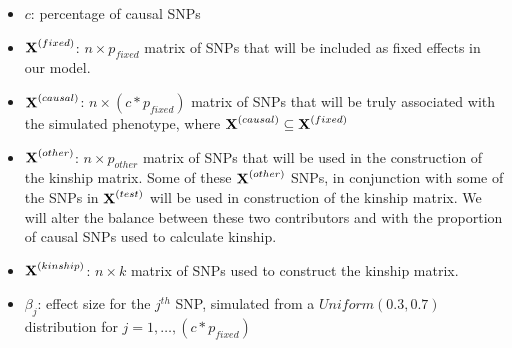\begin{itemize}
	\item $c$: percentage of causal SNPs
	\item $\textbf{X}^{(fixed)}$: $n \times p_{fixed}$ matrix of SNPs that will be included as fixed effects in our model.
	\item $\textbf{X}^{(causal)}$: $n \times (c*p_{fixed})$ matrix of SNPs that will be truly associated with the simulated phenotype, where $\textbf{X}^{(causal)} \subseteq \textbf{X}^{(fixed)}$
	\item $\textbf{X}^{(other)}$: $n \times p_{other}$ matrix of SNPs that will be used in the construction of the kinship matrix. Some of these $\textbf{X}^{(other)}$ SNPs, in conjunction with some of the SNPs in $\textbf{X}^{(test)}$ will be used in construction of the kinship matrix. We will alter the balance between these two contributors and with the proportion of causal SNPs used to calculate kinship. 
	\item $\textbf{X}^{(kinship)}$: $n \times k$ matrix of SNPs used to construct the kinship matrix.
	\item $\beta_j$: effect size for the $j^{th}$ SNP, simulated from a $Uniform(0.3,0.7)$ distribution for $j = 1, \ldots, (c*p_{fixed})$
\end{itemize}

